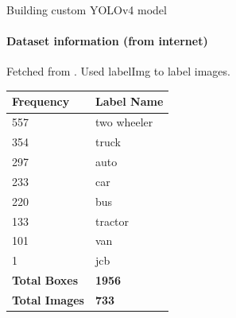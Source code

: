 \documentclass{beamer}
\newcommand{\link}[2]{\href{#1}{\textit{\color{blue}{#2}}}}%
\begin{document}
	\begin{frame}[allowframebreaks]{Building custom YOLOv4 model}
		\framesubtitle{Dataset information (from internet)}
		Fetched from \link{https://www.kaggle.com/datasets/dataclusterlabs/indian-vehicle-dataset}{Kaggle}. Used labelImg to label images. 
		\begin{table}[]
			\centering
			\begin{tabular}{|l|l|}
				\hline
				\textbf{Frequency}    & \textbf{Label Name} \\ \hline
				557                   & two wheeler         \\ \hline
				354                   & truck               \\ \hline
				297                   & auto                \\ \hline
				233                   & car                 \\ \hline
				220                   & bus                 \\ \hline
				133                   & tractor             \\ \hline
				101                   & van                 \\ \hline
				1                     & jcb                 \\ \hline
				\textbf{Total Boxes}  & \textbf{1956}       \\ \hline
				\textbf{Total Images} & \textbf{733}        \\ \hline
			\end{tabular}
		\end{table}
		
		
		

\end{frame}
\end{document}
